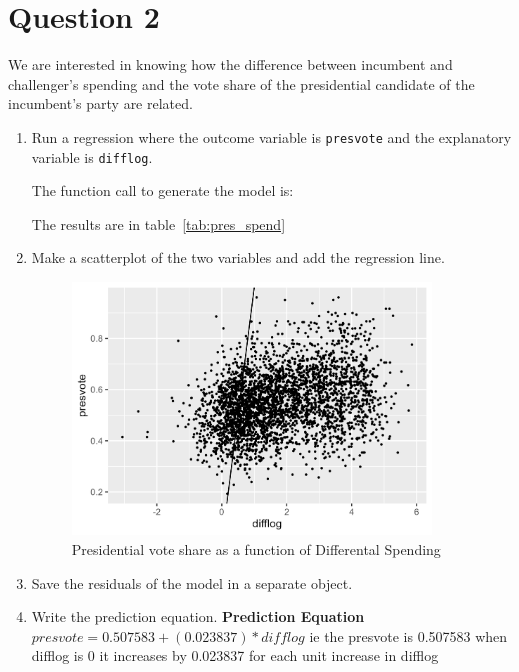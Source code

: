 \documentclass[12pt,letterpaper]{article}
\begin{document}
\newpage

\section*{Question 2}
\noindent We are interested in knowing how the difference between incumbent and challenger's spending and the vote share of the presidential candidate of the incumbent's party are related.\vspace{.25cm}

	\begin{enumerate}
		\item Run a regression where the outcome variable is \texttt{presvote} and the explanatory variable is \texttt{difflog}.	
		
  The function call to generate the model is:
	
  The results are in table~\ref{tab:pres_spend}
  
		
		\item Make a scatterplot of the two variables and add the regression line.
	\begin{figure}
		  \includegraphics[width=0.9\textwidth]{Graphics/pres_spend.png}
		  \caption{Presidential vote share as a function of Differental Spending}
		  \label{fig:pres_spend}
	\end{figure}
		
		\item Save the residuals of the model in a separate object.	
	
		
		\item Write the prediction equation.
    \textbf{Prediction Equation} 
     $presvote = 0.507583 + (0.023837) * difflog$
     ie the presvote is 0.507583 when difflog is 0
        it increases by 0.023837 for each unit increase in difflog

	\end{enumerate}
\end{document}
